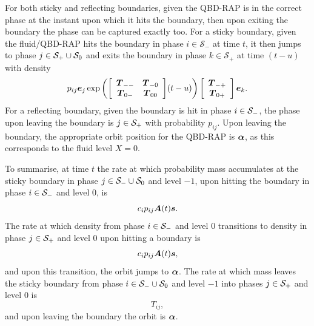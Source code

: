 For both sticky and reflecting boundaries, given the QBD-RAP is in the correct phase at the instant upon which it hits the boundary, then upon exiting the boundary the phase can be captured exactly too. For a sticky boundary, given the fluid/QBD-RAP hits the boundary in phase \(i\in\mathcal S_-\) at time \(t\), it then jumps to phase \(j\in\mathcal{S}_+\cup\mathcal{S}_0\) and exits the boundary in phase \(k\in\mathcal S_+\) at time \((t-u)\) with density 
\[p_{ij}\boldsymbol e_j \exp\left({\left[\begin{array}{cc} \boldsymbol T_{--} & \boldsymbol T_{-0} \\ \boldsymbol T_{0-} & \boldsymbol T_{00}\end{array}\right]}(t-u)\right)\left[\begin{array}{c} \boldsymbol T_{-+} \\ \boldsymbol T_{0+}\end{array}\right]\boldsymbol e_k.\] 
For a reflecting boundary, given the boundary is hit in phase \(i\in\mathcal{S}_-\), the phase upon leaving the boundary is \(j\in\mathcal{S}_+\) with probability \(p_{ij}\). Upon leaving the boundary, the appropriate orbit position for the QBD-RAP is \(\boldsymbol \alpha\), as this corresponds to the fluid level \(X=0\). 

To summarise, at time \(t\) the rate at which probability mass accumulates at the sticky boundary in phase \(j \in\mathcal{S}_-\cup\mathcal{S}_0\) and level \(-1\), upon hitting the boundary in phase \(i\in\mathcal{S}_-\) and level \(0\), is 
\[ c_ip_{ij} \boldsymbol A(t)\boldsymbol s.\]
The rate at which density from phase \(i\in\mathcal{S}_-\) and level \(0\) transitions to density in phase \(j\in\mathcal{S}_+\) and level \(0\) upon hitting a boundary is 
\[ c_ip_{ij} \boldsymbol A(t)\boldsymbol s,\]
and upon this transition, the orbit jumps to \(\boldsymbol \alpha\). 
The rate at which mass leaves the sticky boundary from phase \(i\in\mathcal{S}_-\cup\mathcal{S}_0\) and level \(-1\) into phases \(j\in\mathcal{S}_+\) and level \(0\) is 
\[T_{ij},\]
and upon leaving the boundary the orbit is \(\boldsymbol\alpha\). 

